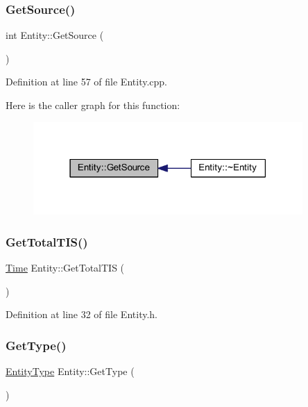 \subsubsection{\texorpdfstring{Get\+Source()}{GetSource()}}
{\footnotesize\ttfamily int Entity\+::\+Get\+Source (\begin{DoxyParamCaption}{ }\end{DoxyParamCaption})}



Definition at line 57 of file Entity.\+cpp.

Here is the caller graph for this function\+:\nopagebreak
\begin{figure}[H]
\begin{center}
\leavevmode
\includegraphics[width=291pt]{class_entity_a22d4fe26b229f7720f5204eeadffb1b2_icgraph}
\end{center}
\end{figure}
\mbox{\label{class_entity_abaed105c13bcd367823d4c1167e3042a}} 
\subsubsection{\texorpdfstring{Get\+Total\+T\+I\+S()}{GetTotalTIS()}}
{\footnotesize\ttfamily \hyperlink{_simulation_executive_8h_ac2d3e0ba793497bcca555c7c2cf64ff3}{Time} Entity\+::\+Get\+Total\+T\+IS (\begin{DoxyParamCaption}{ }\end{DoxyParamCaption})\hspace{0.3cm}{\ttfamily [inline]}}



Definition at line 32 of file Entity.\+h.

\mbox{\label{class_entity_a6618c119290b237bd6f9e903d029405d}} 
\subsubsection{\texorpdfstring{Get\+Type()}{GetType()}}
{\footnotesize\ttfamily \hyperlink{_entity_8h_ad79a57ed3105eb60d991a1aeb4a9dc44}{Entity\+Type} Entity\+::\+Get\+Type (\begin{DoxyParamCaption}{ }\end{DoxyParamCaption})}



